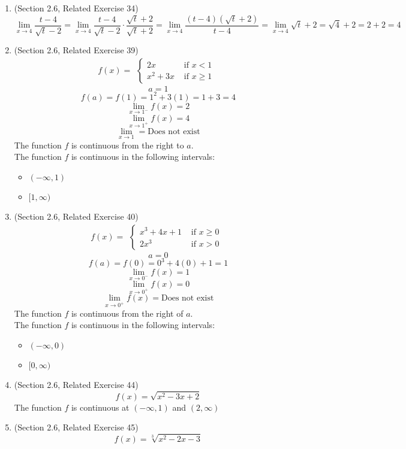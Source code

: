 \documentclass{article}
\begin{document}
\begin{enumerate}
	\item (Section 2.6, Related Exercise 34)
		$$\lim_{x \to 4}{\frac{t - 4}{\sqrt{t} - 2}} = \lim_{x \to 4}{\frac{t - 4}{\sqrt{t} - 2} \cdot \frac{\sqrt{t} + 2}{\sqrt{t} + 2}} = \lim_{x \to 4}{\frac{(t - 4)(\sqrt{t} + 2)}{t - 4}} = \lim_{x \to 4}{\sqrt{t} + 2} = \sqrt{4} + 2 = 2 + 2 = 4$$
	\item (Section 2.6, Related Exercise 39)
		$$f(x) = \begin{aligned}
			\begin{cases}
				2x &\text{ if } x < 1 \\
				x^2 + 3x &\text{ if } x \geq 1
			\end{cases}
		\end{aligned}$$
		$$a = 1$$
		$$f(a) = f(1) = 1^2 + 3(1) = 1+3 = 4$$
		$$\lim_{x \to 1^-}{f(x)} = 2$$
		$$\lim_{x \to 1^+}{f(x)} = 4$$
		$$\lim_{x \to 1} = \text{Does not exist}$$
		The function $f$ is continuous from the right to $a$. \\
		The function $f$ is continuous in the following intervals:
		\begin{itemize}
			\item $(- \infty, 1)$
			\item $[1, \infty)$
		\end{itemize}
	\item (Section 2.6, Related Exercise 40)
		$$f(x) = \begin{aligned}
			\begin{cases}
				x^3 + 4x + 1 &\text{ if } x \geq 0 \\
				2x^3 &\text{ if } x > 0
			\end{cases}
		\end{aligned}$$
		$$a = 0$$
		$$f(a) = f(0) = 0^3 + 4(0) + 1 = 1$$
		$$\lim_{x \to 0^-}{f(x)} = 1$$
		$$\lim_{x \to 0^+}{f(x)} = 0$$
		$$\lim_{x \to 0^+}{f(x)} = \text{Does not exist}$$
		The function $f$ is continuous from the right of $a$. \\
		The function $f$ is continuous in the following intervals:
		\begin{itemize}
			\item $(- \infty, 0)$
			\item $[0, \infty)$
		\end{itemize}
	\item (Section 2.6, Related Exercise 44)
		$$f(x) = \sqrt{x^2 - 3x + 2}$$
		The function $f$ is continuous at $(- \infty, 1)$ and $(2, \infty)$
	\item (Section 2.6, Related Exercise 45)
		$$f(x) = \sqrt[3]{x^2 - 2x - 3}$$

\end{enumerate}
\end{document}
